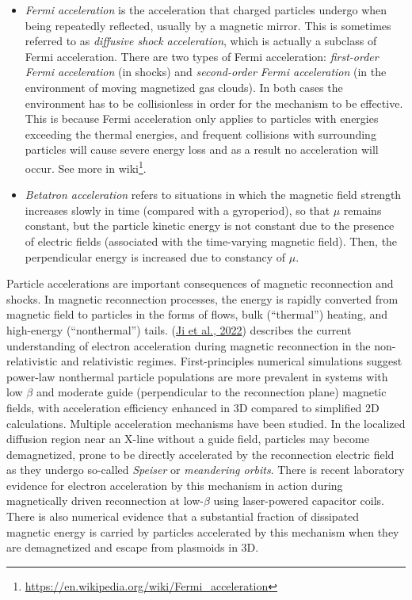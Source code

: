 \documentclass[
  notoc %
]{tufte-book}
\DeclareRobustCommand{\href}[2]{#2\footnote{\url{#1}}}
\begin{document}
\begin{itemize}
\item
  \emph{Fermi acceleration} is the acceleration that charged particles
  undergo when being repeatedly reflected, usually by a magnetic mirror.
  This is sometimes referred to as \emph{diffusive shock acceleration},
  which is actually a subclass of Fermi acceleration. There are two
  types of Fermi acceleration: \emph{first-order Fermi acceleration} (in
  shocks) and \emph{second-order Fermi acceleration} (in the environment
  of moving magnetized gas clouds). In both cases the environment has to
  be collisionless in order for the mechanism to be effective. This is
  because Fermi acceleration only applies to particles with energies
  exceeding the thermal energies, and frequent collisions with
  surrounding particles will cause severe energy loss and as a result no
  acceleration will occur. See more in
  \href{https://en.wikipedia.org/wiki/Fermi_acceleration}{wiki}.
\item
  \emph{Betatron acceleration} refers to situations in which the
  magnetic field strength increases slowly in time (compared with a
  gyroperiod), so that \(\mu\) remains constant, but the particle
  kinetic energy is not constant due to the presence of electric fields
  (associated with the time-varying magnetic field). Then, the
  perpendicular energy is increased due to constancy of \(\mu\).
\end{itemize}

Particle accelerations are important consequences of magnetic
reconnection and shocks. In magnetic reconnection processes, the energy
is rapidly converted from magnetic field to particles in the forms of
flows, bulk (``thermal'') heating, and high-energy (``nonthermal'')
tails. (\protect\hyperlink{ref-ji2022magnetic}{Ji et al., 2022})
describes the current understanding of electron acceleration during
magnetic reconnection in the non-relativistic and relativistic regimes.
First-principles numerical simulations suggest power-law nonthermal
particle populations are more prevalent in systems with low \(\beta\)
and moderate guide (perpendicular to the reconnection plane) magnetic
fields, with acceleration efficiency enhanced in 3D compared to
simplified 2D calculations. Multiple acceleration mechanisms have been
studied. In the localized diffusion region near an X-line without a
guide field, particles may become demagnetized, prone to be directly
accelerated by the reconnection electric field as they undergo so-called
\emph{Speiser} or \emph{meandering orbits}. There is recent laboratory
evidence for electron acceleration by this mechanism in action during
magnetically driven reconnection at low-\(\beta\) using laser-powered
capacitor coils. There is also numerical evidence that a substantial
fraction of dissipated magnetic energy is carried by particles
accelerated by this mechanism when they are demagnetized and escape from
plasmoids in 3D.
\end{document}
